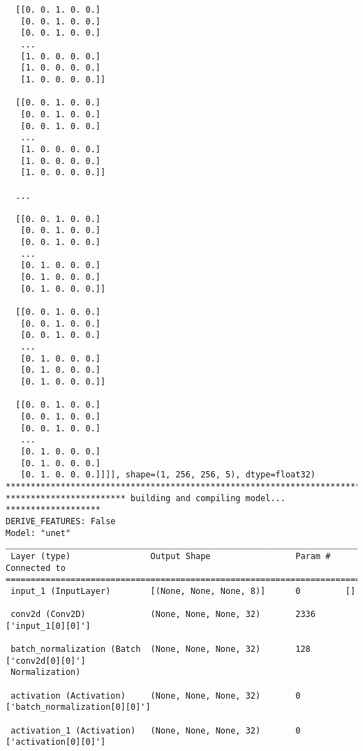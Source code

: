 \documentclass[
  letterpaper,
  DIV=11,
  numbers=noendperiod]{scrreprt}
\begin{document}
\begin{verbatim}
  [[0. 0. 1. 0. 0.]
   [0. 0. 1. 0. 0.]
   [0. 0. 1. 0. 0.]
   ...
   [1. 0. 0. 0. 0.]
   [1. 0. 0. 0. 0.]
   [1. 0. 0. 0. 0.]]

  [[0. 0. 1. 0. 0.]
   [0. 0. 1. 0. 0.]
   [0. 0. 1. 0. 0.]
   ...
   [1. 0. 0. 0. 0.]
   [1. 0. 0. 0. 0.]
   [1. 0. 0. 0. 0.]]

  ...

  [[0. 0. 1. 0. 0.]
   [0. 0. 1. 0. 0.]
   [0. 0. 1. 0. 0.]
   ...
   [0. 1. 0. 0. 0.]
   [0. 1. 0. 0. 0.]
   [0. 1. 0. 0. 0.]]

  [[0. 0. 1. 0. 0.]
   [0. 0. 1. 0. 0.]
   [0. 0. 1. 0. 0.]
   ...
   [0. 1. 0. 0. 0.]
   [0. 1. 0. 0. 0.]
   [0. 1. 0. 0. 0.]]

  [[0. 0. 1. 0. 0.]
   [0. 0. 1. 0. 0.]
   [0. 0. 1. 0. 0.]
   ...
   [0. 1. 0. 0. 0.]
   [0. 1. 0. 0. 0.]
   [0. 1. 0. 0. 0.]]]], shape=(1, 256, 256, 5), dtype=float32)
****************************************************************************
************************ building and compiling model... *******************
DERIVE_FEATURES: False
Model: "unet"
__________________________________________________________________________________________________
 Layer (type)                Output Shape                 Param #   Connected to                  
==================================================================================================
 input_1 (InputLayer)        [(None, None, None, 8)]      0         []                            
                                                                                                  
 conv2d (Conv2D)             (None, None, None, 32)       2336      ['input_1[0][0]']             
                                                                                                  
 batch_normalization (Batch  (None, None, None, 32)       128       ['conv2d[0][0]']              
 Normalization)                                                                                   
                                                                                                  
 activation (Activation)     (None, None, None, 32)       0         ['batch_normalization[0][0]'] 
                                                                                                  
 activation_1 (Activation)   (None, None, None, 32)       0         ['activation[0][0]']          
                                                                                                  

\end{verbatim}
\end{document}
